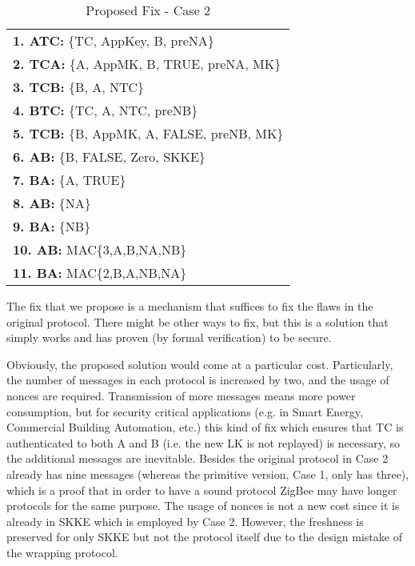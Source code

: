 \begin{table}\caption{Proposed Fix - Case 2}
\label{tab:fix2}
\centering
\begin{tabular}{l}
\hline
\textbf{1. ATC:} \{TC, AppKey, B, preNA\}   \\
\textbf{2. TCA:} \{A, AppMK, B, TRUE, preNA, MK\} \\
\textbf{3. TCB:} \{B, A, NTC\} \\
\textbf{4. BTC:} \{TC, A, NTC, preNB\}                 \\                           
\textbf{5. TCB:} \{B, AppMK, A, FALSE, preNB, MK\}      \\                
\textbf{6. AB:} \{B, FALSE, Zero, SKKE\} \\
\textbf{7. BA:} \{A, TRUE\}                 \\                           
\textbf{8. AB:} \{NA\}      \\                
\textbf{9. BA:} \{NB\}                  \\                       
\textbf{10. AB:} MAC\{3,A,B,NA,NB\}        \\
\textbf{11. BA:} MAC\{2,B,A,NB,NA\}        \\
\hline
\end{tabular}
\end{table}
The fix that we propose is a mechanism that suffices to fix the flaws in the original protocol. 
There might be other ways to fix, but this is a solution that simply
works and has proven (by formal verification) to be secure.

Obviously, the proposed solution would come at a particular
cost. Particularly, the
number of messages in each protocol is increased by two, and the usage of
nonces are required. Transmission of more messages means more power
consumption, but for security critical applications (e.g. in Smart
Energy, Commercial Building Automation, etc.)
 this kind of fix which ensures that TC is authenticated to both A and B (i.e. the new LK is not replayed)
is necessary, so the additional messages are inevitable.
Besides the original protocol in Case 2 already has nine messages (whereas the primitive version, Case 1, only has three), which is a proof that in order to
have a sound protocol ZigBee may have longer protocols for the same purpose.
The usage of nonces is not a new cost since it is already in SKKE which is employed by Case 2.
However, the freshness is preserved for only SKKE but not the protocol
itself due to the design mistake of the wrapping protocol.

